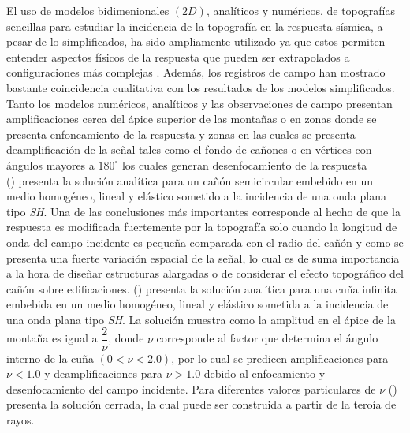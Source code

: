 \documentclass[spanish,letterpaper,12pt,twoside,openany]{article}
\begin{document}
El uso de modelos bidimenionales $\left( 2D \right)$, analíticos y numéricos, de topografías sencillas para estudiar la incidencia de la topografía en la respuesta sísmica, a pesar de lo simplificados, ha sido ampliamente utilizado ya que estos permiten entender aspectos físicos de la respuesta que pueden ser extrapolados a configuraciones más complejas \citep{Jaramillo2013, Gomez2013, SanchezSesma1990, SanchezSesma1985, Pathak1974, Trifunac1973}. Además, los registros de campo han mostrado bastante coincidencia cualitativa con los resultados de los modelos simplificados. Tanto los modelos numéricos, analíticos y las observaciones de campo presentan amplificaciones cerca del ápice superior de las montañas o en zonas donde se presenta enfoncamiento de la respuesta \citep{Geli1988} y zonas en las cuales se presenta deamplificación de la señal tales como el fondo de cañones o en vértices con ángulos mayores a $180^\circ$ los cuales generan desenfocamiento de la respuesta \citep{assimaki2005effects}\\
%
\citeauthor{Trifunac1973} (\citeyear{Trifunac1973}) presenta la solución analítica para un cañón semicircular embebido en un medio homogéneo, lineal y elástico sometido a la incidencia de una onda plana tipo \textit{SH}. Una de las conclusiones más importantes corresponde al hecho de que la respuesta es modificada fuertemente por la topografía solo cuando la longitud de onda del campo incidente es pequeña comparada con el radio del cañón y como se presenta una fuerte variación espacial de la señal, lo cual es de suma importancia a la hora de diseñar estructuras alargadas o de considerar el efecto topográfico del cañón sobre edificaciones. \citeauthor{SanchezSesma1985} (\citeyear{SanchezSesma1985}) presenta la solución analítica para una cuña infinita embebida en un medio homogéneo, lineal y elástico sometida a la incidencia de una onda plana tipo \textit{SH}. La solución muestra como la amplitud en el ápice de la montaña es igual a $\dfrac{2}{\nu}$, donde $\nu$ corresponde al factor que determina el ángulo interno de la cuña $\left( 0 < \nu < 2.0 \right)$, por lo cual se predicen amplificaciones para $\nu < 1.0$ y deamplificaciones para $\nu > 1.0$ debido al enfocamiento y desenfocamiento del campo incidente. Para diferentes valores particulares de $\nu$ \citeauthor{SanchezSesma1990} (\citeyear{SanchezSesma1990}) presenta la solución cerrada, la cual puede ser construida a partir de la teroía de rayos.\\
%
\end{document}
